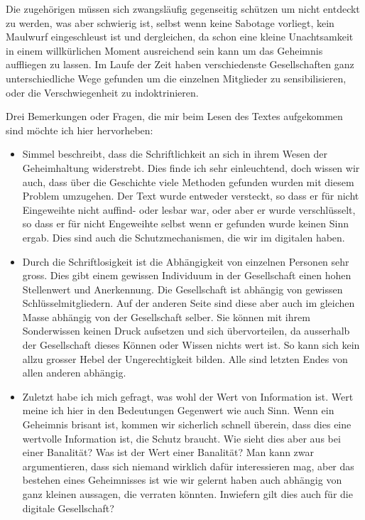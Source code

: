 \documentclass[a4paper,ngerman,11pt]{scrartcl}
\begin{document}
Die zugehörigen müssen sich zwangsläufig gegenseitig schützen um nicht
entdeckt zu werden, was aber schwierig ist, selbst wenn keine Sabotage
vorliegt, kein Maulwurf eingeschleust ist und dergleichen, da schon eine
kleine Unachtsamkeit in einem willkürlichen Moment ausreichend sein kann um
das Geheimnis auffliegen zu lassen. Im Laufe der Zeit haben verschiedenste
Gesellschaften ganz unterschiedliche Wege gefunden um die einzelnen Mitglieder
zu sensibilisieren, oder die Verschwiegenheit zu indoktrinieren.\cite{Simmel1992}

Drei Bemerkungen oder Fragen, die mir beim Lesen des Textes aufgekommen sind
möchte ich hier hervorheben:

\begin{itemize}
\item Simmel beschreibt, dass die Schriftlichkeit an sich in ihrem Wesen der
Geheimhaltung widerstrebt.\cite{Simmel1992} Dies finde ich sehr einleuchtend,
doch wissen wir auch, dass über die Geschichte viele Methoden gefunden
wurden mit diesem Problem umzugehen. Der Text wurde entweder versteckt, so
dass er für nicht Eingeweihte nicht auffind- oder lesbar war, oder aber er
wurde verschlüsselt, so dass er für nicht Engeweihte selbst wenn er gefunden
wurde keinen Sinn ergab. Dies sind auch die Schutzmechanismen, die wir im
digitalen haben.
\item Durch die Schriftlosigkeit ist die Abhängigkeit von einzelnen Personen sehr
gross. Dies gibt einem gewissen Individuum in der Gesellschaft einen hohen
Stellenwert und Anerkennung. Die Gesellschaft ist abhängig von gewissen
Schlüsselmitgliedern. Auf der anderen Seite sind diese aber auch im gleichen
Masse abhängig von der Gesellschaft selber. Sie können mit ihrem
Sonderwissen keinen Druck aufsetzen und sich übervorteilen, da ausserhalb
der Gesellschaft dieses Können oder Wissen nichts wert ist. So kann sich
kein allzu grosser Hebel der Ungerechtigkeit bilden. Alle sind letzten Endes
von allen anderen abhängig.
\item Zuletzt habe ich mich gefragt, was wohl der Wert von Information ist. Wert
meine ich hier in den Bedeutungen Gegenwert wie auch Sinn. Wenn ein
Geheimnis brisant ist, kommen wir sicherlich schnell überein, dass dies eine
wertvolle Information ist, die Schutz braucht. Wie sieht dies aber aus bei
einer Banalität? Was ist der Wert einer Banalität? Man kann zwar
argumentieren, dass sich niemand wirklich dafür interessieren mag, aber das
bestehen eines Geheimnisses ist wie wir gelernt haben auch abhängig von ganz
kleinen aussagen, die verraten könnten. Inwiefern gilt dies auch für die
digitale Gesellschaft?
\end{itemize}



\end{document}

